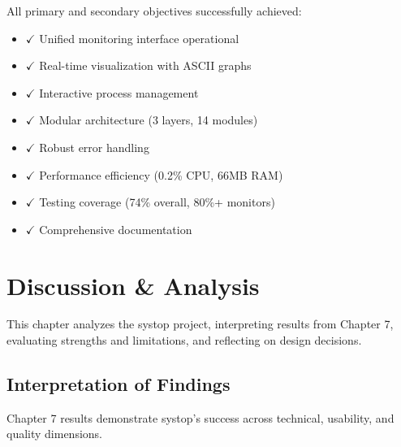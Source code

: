 \documentclass[12pt,a4paper,oneside]{report}
\begin{document}
All primary and secondary objectives successfully achieved:
\begin{itemize}
    \item $\checkmark$ Unified monitoring interface operational
    \item $\checkmark$ Real-time visualization with ASCII graphs
    \item $\checkmark$ Interactive process management
    \item $\checkmark$ Modular architecture (3 layers, 14 modules)
    \item $\checkmark$ Robust error handling
    \item $\checkmark$ Performance efficiency (0.2\% CPU, 66MB RAM)
    \item $\checkmark$ Testing coverage (74\% overall, 80\%+ monitors)
    \item $\checkmark$ Comprehensive documentation
\end{itemize}

\chapter{Discussion \& Analysis}
\label{chap:discussion}

This chapter analyzes the systop project, interpreting results from Chapter 7, evaluating strengths and limitations, and reflecting on design decisions.

\section{Interpretation of Findings}
\label{sec:interpretation}

Chapter 7 results demonstrate systop's success across technical, usability, and quality dimensions.
\end{document}
